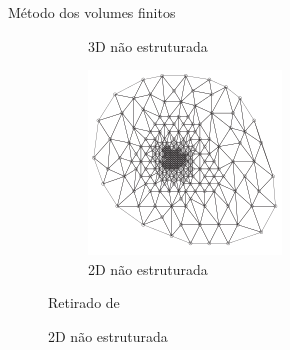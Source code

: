 \documentclass[professionalfont]{beamer}
\begin{document}
\begin{frame}{Método dos volumes finitos}
\begin{figure}[!ht]
\begin{subfigure}{.45\textwidth}
        \caption{3D não estruturada}
        \label{fig:volumes_finitos1.c}
    \end{subfigure}
    \begin{subfigure}{.45\textwidth}
        \centering
        \includegraphics[scale=0.27]{./imgs/im5.png}
        \caption{2D não estruturada}
        \label{fig:volumes_finitos1.d}
    \end{subfigure}

    {\footnotesize Retirado de \cite{Knut2019}}
\end{figure}

\end{frame}
\end{document}
